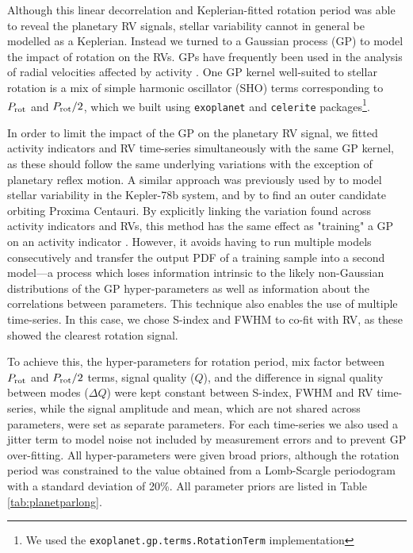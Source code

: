 \documentclass[fleqn,usenatbib]{mnras}
\begin{document}
Although this linear decorrelation and Keplerian-fitted rotation period was able to reveal the planetary RV signals, stellar variability cannot in general be modelled as a Keplerian.
Instead we turned to a Gaussian process (GP) to model the impact of rotation on the RVs.
GPs have frequently been used in the analysis of radial velocities affected by activity \citep[e.g.][]{2014MNRAS.443.2517H,2019A&A...627A..43D}.
One GP kernel well-suited to stellar rotation is a mix of simple harmonic oscillator (SHO) terms corresponding to $P_{\rm rot}$ and $P_{\rm rot}/2$, which we built using \texttt{exoplanet} and \texttt{celerite} packages\footnote{We used the \texttt{exoplanet.gp.terms.RotationTerm} implementation}.

In order to limit the impact of the GP on the planetary RV signal, we fitted activity indicators and RV time-series simultaneously with the same GP kernel, as these should follow the same underlying variations with the exception of planetary reflex motion.
A similar approach was previously used by \citet{grunblatt2015determining} to model stellar variability in the Kepler-78b system, and by \citet{2020A&A...639A..77S} to find an outer candidate orbiting Proxima Centauri.
By explicitly linking the variation found across activity indicators and RVs, this method has the same effect as "training" a GP on an activity indicator \citep[e.g.][]{2019A&A...627A..43D}.
However, it avoids having to run multiple models consecutively and transfer the output PDF of a training sample into a second model---a process which loses information intrinsic to the likely non-Gaussian distributions of the GP hyper-parameters as well as information about the correlations between parameters.
This technique also enables the use of multiple time-series.
In this case, we chose S-index and FWHM to co-fit with RV, as these showed the clearest rotation signal.

To achieve this, the hyper-parameters for rotation period, mix factor between $P_{\rm rot}$ and $P_{\rm rot}/2$ terms, signal quality ($Q$), and the difference in signal quality between modes ($\Delta Q$) were kept constant between S-index, FWHM and RV time-series, while the signal amplitude and mean, which are not shared across parameters, were set as separate parameters.
For each time-series we also used a jitter term to model noise not included by measurement errors and to prevent GP over-fitting.
All hyper-parameters were given broad priors, although the rotation period was constrained to the value obtained from a Lomb-Scargle periodogram \citep{Lomb1976, Scargle1982} with a standard deviation of 20\%.
All parameter priors are listed in Table \ref{tab:planetparlong}.
\end{document}
